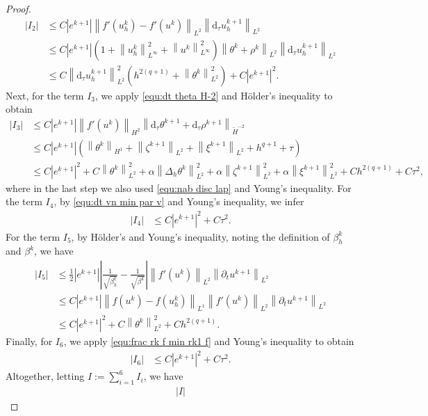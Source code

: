 \documentclass[11pt, reqno]{amsart}
\theoremstyle{definition}
\numberwithin{equation}{section}
\newcommand{\dtt}{\mathrm{d}_\tau}
\newcommand{\norm}[2]{\left\|{#1}\right\|_{#2}}
\newcommand{\abs}[1]{\left|{#1}\right|}
\begin{document}
\begin{proof}
\begin{align*}
	\abs{I_2}
	&\leq
	C\abs{e^{k+1}} \norm{f'(u_h^k)-f'(u^k)}{L^2} \norm{\dtt u_h^{k+1}}{L^2}
	\\
	&\leq
	C\abs{e^{k+1}} \left(1+\norm{u_h^k}{L^\infty}^2 + \norm{u^k}{L^\infty}^2\right) \norm{\theta^k+\rho^k}{L^2} \norm{\dtt u_h^{k+1}}{L^2} 
	\\
	&\leq
	C\norm{\dtt u_h^{k+1}}{L^2}^2 \left(h^{2(q+1)} + \norm{\theta^k}{L^2}^2\right) + C \abs{e^{k+1}}^2.
\end{align*}
Next, for the term $I_3$, we apply \eqref{equ:dt theta H-2} and H\"older's inequality to obtain
\begin{align*}
	\abs{I_3}
	&\leq
	C \abs{e^{k+1}} \norm{f'(u^k)}{H^2} \norm{\dtt \theta^{k+1}+ \dtt \rho^{k+1}}{\widetilde{H}^{-2}}
	\\
	&\leq
	C \abs{e^{k+1}} \left(\norm{\theta^k}{H^1}+ \norm{\zeta^{k+1}}{L^2} + \norm{\xi^{k+1}}{L^2} + h^{q+1} + \tau\right)
	\\
	&\leq
	C\abs{e^{k+1}}^2 + C\norm{\theta^k}{L^2}^2 + \alpha \norm{\Delta_h \theta^k}{L^2}^2
	+
	\alpha \norm{\zeta^{k+1}}{L^2}^2
	+
	\alpha \norm{\xi^{k+1}}{L^2}^2
	+
	Ch^{2(q+1)} + C\tau^2,
\end{align*}
where in the last step we also used \eqref{equ:nab disc lap} and Young's inequality. For the term $I_4$, by \eqref{equ:dt vn min par v} and Young's inequality, we infer
\begin{align*}
	\abs{I_4}
	&\leq
	C\abs{e^{k+1}}^2 + C\tau^2.
\end{align*}
For the term $I_5$, by H\"older's and Young's inequality, noting the definition of $\beta_h^k$ and $\beta^k$, we have
\begin{align*}
	\abs{I_5}
	&\leq
	\frac12 \abs{e^{k+1}} \abs{\frac{1}{\sqrt{\beta_h^k}}- \frac{1}{\sqrt{\beta^k}}} \norm{f'(u^k)}{L^2} \norm{\partial_t u^{k+1}}{L^2}
	\\
	&\leq
	C\abs{e^{k+1}} \norm{f(u^k)-f(u_h^k)}{L^1} \norm{f'(u^k)}{L^2} \norm{\partial_t u^{k+1}}{L^2}
	\\
	&\leq
	C \abs{e^{k+1}}^2 + C\norm{\theta^k}{L^2}^2 + Ch^{2(q+1)}.
\end{align*}
Finally, for $I_6$, we apply \eqref{equ:frac rk f min rk1 f} and Young's inequality to obtain
\begin{align*}
	\abs{I_6}
	&\leq
	C \abs{e^{k+1}}^2+ C\tau^2.
\end{align*}
Altogether, letting $I:= \sum_{i=1}^6 I_i$, we have
\begin{align}\label{equ:est I}
	\abs{I} 

\end{align}
\end{proof}
\end{document}

